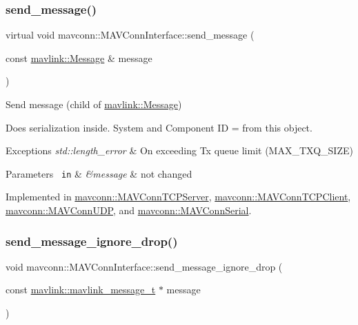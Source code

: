 \subsubsection{\texorpdfstring{send\_message()}{send\_message()}\hspace{0.1cm}{\footnotesize\ttfamily [10/10]}}
{\footnotesize\ttfamily virtual void mavconn\+::\+M\+A\+V\+Conn\+Interface\+::send\+\_\+message (\begin{DoxyParamCaption}\item[{const \mbox{\hyperlink{structmavlink_1_1Message}{mavlink\+::\+Message}} \&}]{message }\end{DoxyParamCaption})\hspace{0.3cm}{\ttfamily [pure virtual]}}



Send message (child of \mbox{\hyperlink{structmavlink_1_1Message}{mavlink\+::\+Message}}) 

Does serialization inside. System and Component ID = from this object.


\begin{DoxyExceptions}{Exceptions}
{\em std\+::length\+\_\+error} & On exceeding Tx queue limit (M\+A\+X\+\_\+\+T\+X\+Q\+\_\+\+S\+I\+ZE) \\
\hline
\end{DoxyExceptions}

\begin{DoxyParams}[1]{Parameters}
\mbox{\texttt{ in}}  & {\em \&message} & not changed \\
\hline
\end{DoxyParams}


Implemented in \mbox{\hyperlink{group__mavconn_ga8e3d7a81031fe54f3326f2ea4ccfa2ef}{mavconn\+::\+M\+A\+V\+Conn\+T\+C\+P\+Server}}, \mbox{\hyperlink{group__mavconn_ga1194ffc5b74604c5c432591751803f33}{mavconn\+::\+M\+A\+V\+Conn\+T\+C\+P\+Client}}, \mbox{\hyperlink{group__mavconn_gae5e3ad4657f7aa9e970d0cb7a6bc367d}{mavconn\+::\+M\+A\+V\+Conn\+U\+DP}}, and \mbox{\hyperlink{group__mavconn_ga7e251c28c05beb0becbe571f5f39c3bb}{mavconn\+::\+M\+A\+V\+Conn\+Serial}}.

\mbox{\label{group__mavconn_gabf049aebc9a9a9abfd36a1fb0034a433}} 
\subsubsection{\texorpdfstring{send\_message\_ignore\_drop()}{send\_message\_ignore\_drop()}\hspace{0.1cm}{\footnotesize\ttfamily [1/2]}}
{\footnotesize\ttfamily void mavconn\+::\+M\+A\+V\+Conn\+Interface\+::send\+\_\+message\+\_\+ignore\+\_\+drop (\begin{DoxyParamCaption}\item[{const \mbox{\hyperlink{include__v0_89_2mavlink__types_8h_a63b963764c09dc72f4910c1521e325b9}{mavlink\+::mavlink\+\_\+message\+\_\+t}} $\ast$}]{message }\end{DoxyParamCaption})}



